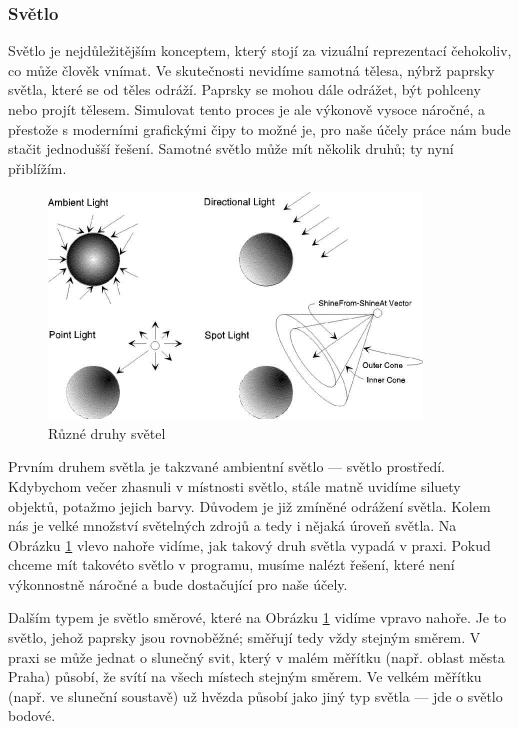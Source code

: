 \documentclass[12pt]{article}
\begin{document}
\subsubsection{Světlo} \label{light}

Světlo je nejdůležitějším konceptem, který stojí za vizuální reprezentací čehokoliv, co může člověk vnímat. Ve skutečnosti nevidíme samotná tělesa, nýbrž paprsky světla, které se od těles odráží. Paprsky se mohou dále odrážet, být pohlceny nebo projít tělesem. Simulovat tento proces je ale výkonově vysoce náročné, a přestože s moderními grafickými čipy to možné je, pro naše účely práce nám bude stačit jednodušší řešení. Samotné světlo může mít několik druhů; ty nyní přiblížím. \cite{light}

\vspace{0.5cm}
\begin{figure}[h]
    \centering
    \includegraphics[height=6cm]{images/light_img.jpeg}
    \caption[Různé druhy světel]{Různé druhy světel \cite{light_img}}
    \label{fig:Různé druhy světel}
\end{figure}

Prvním druhem světla je takzvané ambientní světlo — světlo prostředí. Kdybychom večer zhasnuli v místnosti světlo, stále matně uvidíme siluety objektů, potažmo jejich barvy. Důvodem je již zmíněné odrážení světla. Kolem nás je velké množství světelných zdrojů a tedy i nějaká úroveň světla. Na Obrázku \ref{fig:Různé druhy světel} vlevo nahoře vidíme, jak takový druh světla vypadá v praxi. Pokud chceme mít takovéto světlo v programu, musíme nalézt řešení, které není výkonnostně náročné a bude dostačující pro naše účely.

Dalším typem je světlo směrové, které na Obrázku \ref{fig:Různé druhy světel} vidíme vpravo nahoře. Je to světlo, jehož paprsky jsou rovnoběžné; směřují tedy vždy stejným směrem. V praxi se může jednat o slunečný svit, který v malém měřítku (např. oblast města Praha) působí, že svítí na všech místech stejným směrem. Ve velkém měřítku (např. ve sluneční soustavě) už hvězda působí jako jiný typ světla — jde o světlo bodové.
\end{document}
